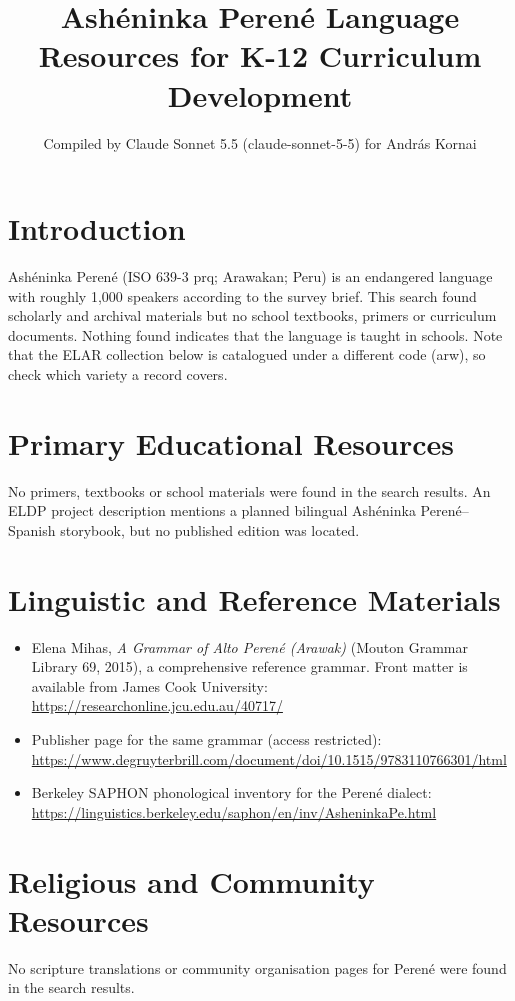 \documentclass[12pt]{article}
\title{Ash\'eninka Peren\'e Language Resources for K-12 Curriculum Development}
\author{Compiled by Claude Sonnet 5.5 (claude-sonnet-5-5) for Andr\'as Kornai}
\date{}
\begin{document}
\maketitle

\section{Introduction}
Ash\'eninka Peren\'e (ISO 639-3 prq; Arawakan; Peru) is an endangered language with roughly 1,000 speakers according to the survey brief. This search found scholarly and archival materials but no school textbooks, primers or curriculum documents. Nothing found indicates that the language is taught in schools. Note that the ELAR collection below is catalogued under a different code (arw), so check which variety a record covers.

\section{Primary Educational Resources}
No primers, textbooks or school materials were found in the search results. An ELDP project description mentions a planned bilingual Ash\'eninka Peren\'e--Spanish storybook, but no published edition was located.

\section{Linguistic and Reference Materials}
\begin{itemize}
\item Elena Mihas, \emph{A Grammar of Alto Perené (Arawak)} (Mouton Grammar Library 69, 2015), a comprehensive reference grammar. Front matter is available from James Cook University: \url{https://researchonline.jcu.edu.au/40717/}
\item Publisher page for the same grammar (access restricted): \url{https://www.degruyterbrill.com/document/doi/10.1515/9783110766301/html}
\item Berkeley SAPHON phonological inventory for the Perené dialect: \url{https://linguistics.berkeley.edu/saphon/en/inv/AsheninkaPe.html}
\end{itemize}

\section{Religious and Community Resources}
No scripture translations or community organisation pages for Perené were found in the search results.
\end{document}
